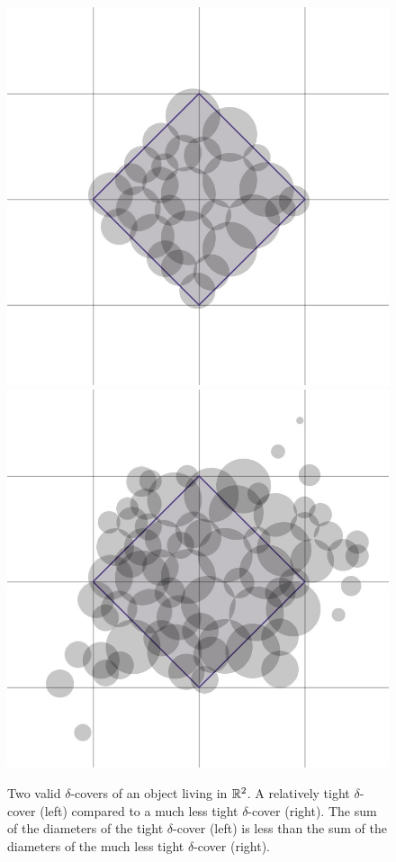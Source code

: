 \documentclass[11pt]{ekblite}
\begin{document}
\begin{figure}[h]
	\includegraphics[scale=0.2]{img/c12.jpg}
	\includegraphics[scale=0.2]{img/c13.jpg}
	\caption{Two valid $\delta$-covers of an object living in $\mathbb{R}^2$. A relatively tight $\delta$-cover (left) compared to a much less tight $\delta$-cover (right). The sum of the diameters of the tight $\delta$-cover (left) is less than the sum of the diameters of the much less tight $\delta$-cover (right). }
\end{figure}
\end{document}
